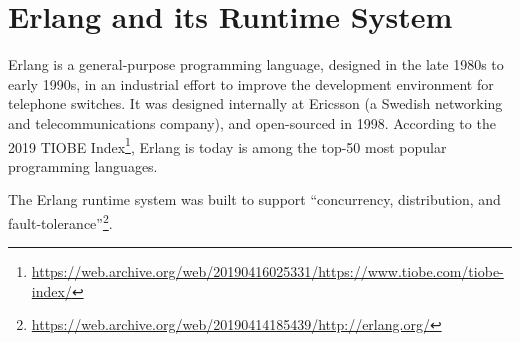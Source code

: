 \section{Erlang and its Runtime System}

Erlang is a general-purpose programming language, designed in the late
1980s to early 1990s, in an industrial effort to improve the
development environment for telephone switches. It was designed
internally at Ericsson (a Swedish networking and telecommunications
company), and open-sourced in 1998. According to the 2019 TIOBE
Index\footnote{\url{https://web.archive.org/web/20190416025331/https://www.tiobe.com/tiobe-index/}},
Erlang is today is among the top-50 most popular programming
languages.

The Erlang runtime system was built to support ``concurrency,
distribution, and
fault-tolerance''\footnote{\url{https://web.archive.org/web/20190414185439/http://erlang.org/}}.
